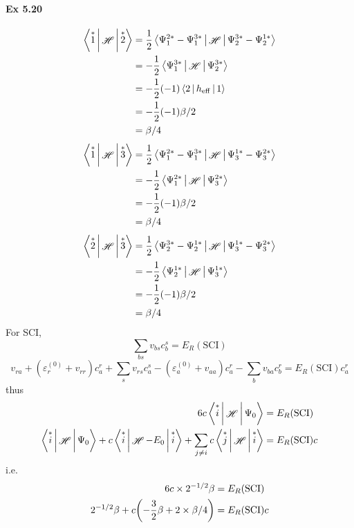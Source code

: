 \documentclass[a4paper]{article}
\DeclareMathOperator{\sH}{\mathscr{H}}
\DeclareMathOperator{\eff}{\mathrm{eff}}
\newcommand{\ex}[1]{\paragraph{Ex #1}}
\numberwithin{equation}{subsection}
\begin{document}
\ex{5.20}
\begin{align}
\Braket{\overset{*}{1} | \sH | \overset{*}{2}} 
&= \dfrac{1}{2} \Braket{\Psi_1^{2*} - \Psi_1^{3*} | \sH | \Psi_2^{3*} - \Psi_2^{1*}} \notag\\
&= -\dfrac{1}{2} \Braket{\Psi_1^{3*} | \sH | \Psi_2^{3*} } \notag\\
&= -\dfrac{1}{2} (-1)\Braket{2 | h_{\eff} | 1} \notag\\
&= -\dfrac{1}{2} (-1)\beta/2 \notag\\
&= \beta/4
\end{align}
\begin{align}
\Braket{\overset{*}{1} | \sH | \overset{*}{3}} 
&= \dfrac{1}{2} \Braket{\Psi_1^{2*} - \Psi_1^{3*} | \sH | \Psi_3^{1*} - \Psi_3^{2*}} \notag\\
&= -\dfrac{1}{2} \Braket{\Psi_1^{2*} | \sH | \Psi_3^{2*} } \notag\\
&= -\dfrac{1}{2} (-1)\beta/2 \notag\\
&= \beta/4
\end{align}
\begin{align}
\Braket{\overset{*}{2} | \sH | \overset{*}{3}} 
&= \dfrac{1}{2} \Braket{\Psi_2^{3*} - \Psi_2^{1*} | \sH | \Psi_3^{1*} - \Psi_3^{2*}} \notag\\
&= -\dfrac{1}{2} \Braket{\Psi_2^{1*} | \sH | \Psi_3^{1*} } \notag\\
&= -\dfrac{1}{2} (-1)\beta/2 \notag\\
&= \beta/4
\end{align}
For SCI,
\begin{equation}\label{key}
\sum_{bs} v_{bs} c_b^s = E_R(\text{SCI})
\end{equation}
\begin{equation}\label{key}
v_{ra} + (\varepsilon_r^{(0)} + v_{rr})c_a^r + \sum_s v_{rs}c_a^s - (\varepsilon_a^{(0)} + v_{aa})c_a^r - \sum_b v_{ba}c_b^r = E_R(\text{SCI}) c_a^r
\end{equation}
thus
\begin{align}
6c\Braket{\overset{*}{i} | \sH | \Psi_0} &= E_R(\text{SCI}) \\
\Braket{\overset{*}{i} | \sH | \Psi_0} 
+ c\Braket{\overset{*}{i} | \sH-E_0 | \overset{*}{i}}
+ \sum_{j\neq i} c\Braket{\overset{*}{j} | \sH | \overset{*}{i}} 
&= E_R(\text{SCI}) c
\end{align}
i.e.
\begin{align}
6c\times 2^{-1/2}\beta &= E_R(\text{SCI}) \\
2^{-1/2}\beta + c\qty(-\dfrac{3}{2}\beta + 2\times \beta/4) 
&= E_R(\text{SCI}) c 
\end{align}
\end{document}
